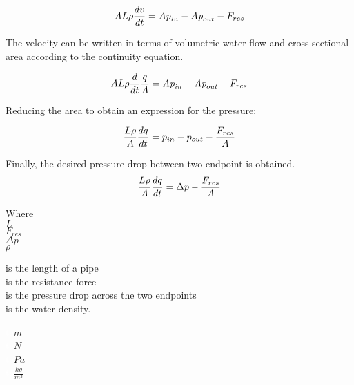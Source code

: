  \begin{equation}
    A L \rho \frac{dv}{dt} = A \textit{p}_{in} - A \textit{p}_{out} - F_{res} \\
\end{equation}

The velocity can be written in terms of volumetric water flow and cross sectional area according to the continuity 
equation.

\begin{equation}
    A L \rho \frac{d}{dt} \frac{q}{A} = A \textit{p}_{in} - A \textit{p}_{out} - F_{res} \\
\end{equation}

Reducing the area to obtain an expression for the pressure: 

\begin{equation}
    \frac{L \rho}{A} \frac{dq}{dt} =p_{in} - p_{out} - \frac{ F_{res}}{A} \\
\end{equation}

Finally, the desired pressure drop between two endpoint is obtained.
\begin{equation}
    \frac{L \rho}{A} \frac{dq}{dt} =\Delta p - \frac{ F_{res}}{A} \\
    \label{PressureDrop}
\end{equation}

 \begin{minipage}[t]{0.20\textwidth}
Where\\
\hspace*{8mm} $L$ \\
\hspace*{8mm} $F_{res}$ \\
\hspace*{8mm} $\Delta p$ \\
\hspace*{8mm} $\rho$ 
\end{minipage}
\begin{minipage}[t]{0.68\textwidth}
\vspace*{2mm}
is the length of a pipe\\
is the resistance force\\
is the pressure drop across the two endpoints\\
is the water density.

\end{minipage}
\begin{minipage}[t]{0.10\textwidth}
\vspace*{2mm}
\textcolor{White}{te}$\unit{m}$\\
\textcolor{White}{te}$\unit{N}$\\
\textcolor{White}{te}$\unit{Pa}$\\
\textcolor{White}{te}$\unit{\frac{kg}{m^{3}}}$
\end{minipage}

